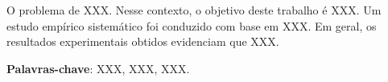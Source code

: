 
\begin{resumo} 
 
O problema de XXX. Nesse contexto, o objetivo deste trabalho é XXX. Um estudo empírico sistemático foi conduzido com base em XXX. Em geral, os resultados experimentais obtidos evidenciam que XXX.

\textbf{Palavras-chave}: XXX, XXX, XXX.

\end{resumo}

